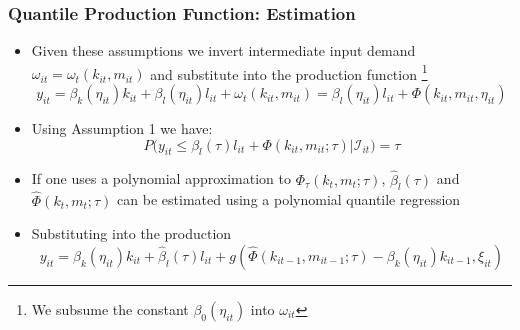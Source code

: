 \documentclass{beamer}
\begin{document}

\begin{frame}
\frametitle{Quantile Production Function: Estimation}
\begin{itemize}
	\item Given these assumptions we invert intermediate input demand $\omega_{it}=\omega_{t}(k_{it}, m_{it})$ and substitute into the production function \footnote{We subsume the constant $\beta_{0}(\eta_{it})$ into $\omega_{it}$}
	\begin{equation}
	y_{it}=\beta_{k}(\eta_{it})k_{it}+\beta_{l}(\eta_{it})l_{it}+\omega_{t}(k_{it}, m_{it})=\beta_{l}(\eta_{it})l_{it}+\Phi(k_{it}, m_{it}, \eta_{it})
	\end{equation}
	\item Using Assumption 1 we have:
	\begin{equation}
	P\big(y_{it}\leq \beta_{l}(\tau)l_{it}+\Phi(k_{it}, m_{it}; \tau)\big|\mathcal{I}_{it})=\tau
	\end{equation}
	\item If one uses a polynomial approximation to $\Phi_{\tau}(k_{t}, m_{t}; \tau)$, $\hat{\beta}_{l}(\tau)$ and $\hat{\Phi}(k_{t}, m_{t}; \tau)$ can be estimated using a polynomial quantile regression
	\item Substituting into the production
	\begin{equation}
	y_{it}=\beta_{k}(\eta_{it})k_{it}+\hat{\beta}_{l}(\tau)l_{it}+g(\hat{\Phi}(k_{it-1}, m_{it-1}; \tau)-\beta_{k}(\eta_{it})k_{it-1}, \xi_{it})
	\end{equation}
\end{itemize}
\end{frame}

\end{document}

